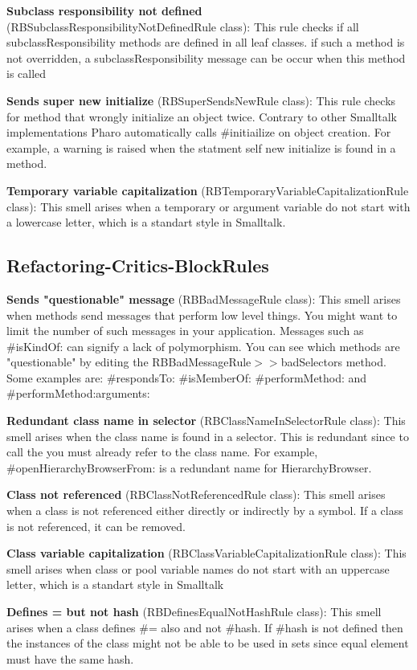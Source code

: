 \textbf{Subclass responsibility not defined} (RBSubclassResponsibilityNotDefinedRule class): This rule checks if all subclassResponsibility methods are defined in all leaf classes. if such a method is not overridden, a subclassResponsibility message can be occur when this method is called

\textbf{Sends super new initialize} (RBSuperSendsNewRule class):  This rule checks for method that wrongly initialize an object twice. Contrary to other Smalltalk implementations Pharo automatically calls \#initiailize on object creation.
For example, a warning is raised when the statment self new initialize is found in a method.

\textbf{Temporary variable capitalization} (RBTemporaryVariableCapitalizationRule class): This smell arises when a temporary or argument variable do not start with a lowercase letter, which is a standart style in Smalltalk.

\subsection{Refactoring-Critics-BlockRules}
\textbf{Sends "questionable" message} (RBBadMessageRule class): This smell arises when methods send messages that perform low level things. You might want to limit the number of such messages in your application. Messages such as \#isKindOf: can signify a lack of polymorphism. You can see which methods are "questionable" by editing the RBBadMessageRule$>>$badSelectors method. Some examples are: \#respondsTo: \#isMemberOf: \#performMethod: and \#performMethod:arguments:

\textbf{Redundant class name in selector} (RBClassNameInSelectorRule class): This smell arises when the class name is found in a selector. This is redundant since to call the you must already refer to the class name. For example, \#openHierarchyBrowserFrom: is a redundant name for HierarchyBrowser.

\textbf{Class not referenced} (RBClassNotReferencedRule class): This smell arises when a class is not referenced either directly or indirectly by a symbol. If a class is not referenced, it can be removed.

\textbf{Class variable capitalization} (RBClassVariableCapitalizationRule class): This smell arises when class or pool variable names do not start with an uppercase letter, which is a standart style in Smalltalk

\textbf{Defines = but not hash} (RBDefinesEqualNotHashRule class): This smell arises when a class defines \#= also and not \#hash. If \#hash is not defined then the instances of the class might not be able to be used in sets since equal element must have the same hash.

